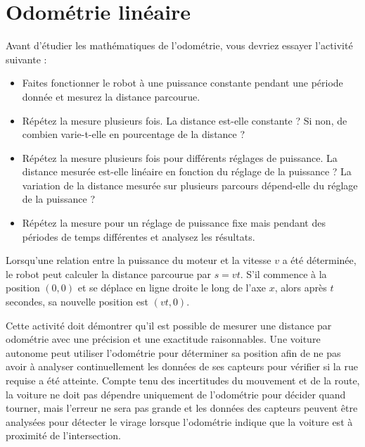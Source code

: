 {\section{Odométrie linéaire}

Avant d'étudier les mathématiques de l'odométrie, vous devriez essayer l'activité suivante :

\begin{framed}
\begin{itemize}
\item Faites fonctionner le robot à une puissance constante pendant une période donnée et mesurez la distance parcourue.
\item Répétez la mesure plusieurs fois. La distance est-elle constante ? Si non, de combien varie-t-elle en pourcentage de la distance ?
\item Répétez la mesure plusieurs fois pour différents réglages de puissance. La distance mesurée est-elle linéaire en fonction du réglage de la puissance ? La variation de la distance mesurée sur plusieurs parcours dépend-elle du réglage de la puissance ?
\item Répétez la mesure pour un réglage de puissance fixe mais pendant des périodes de temps différentes et analysez les résultats.
\end{itemize}
\end{framed}

Lorsqu'une relation entre la puissance du moteur et la vitesse $v$ a été déterminée, le robot peut calculer la distance parcourue par $s=vt$. S'il commence à la position $(0,0)$ et se déplace en ligne droite le long de l'axe $x$, alors après $t$ secondes, sa nouvelle position est $(vt,0)$.

Cette activité doit démontrer qu'il est possible de mesurer une distance par odométrie avec une précision et une exactitude raisonnables. Une voiture autonome peut utiliser l'odométrie pour déterminer sa position afin de ne pas avoir à analyser continuellement les données de ses capteurs pour vérifier si la rue requise a été atteinte. Compte tenu des incertitudes du mouvement et de la route, la voiture ne doit pas dépendre uniquement de l'odométrie pour décider quand tourner, mais l'erreur ne sera pas grande et les données des capteurs peuvent être analysées pour détecter le virage lorsque l'odométrie indique que la voiture est à proximité de l'intersection.

}
